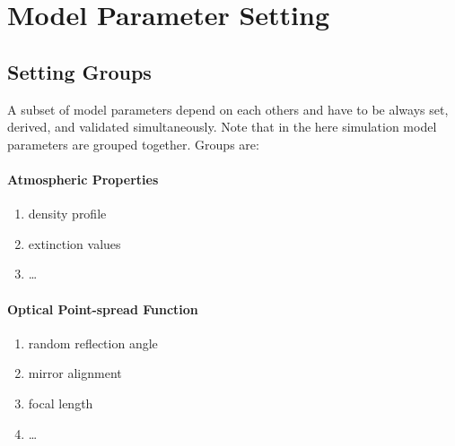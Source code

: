 \section{Model Parameter Setting}

\subsection{Setting Groups}

A subset of model parameters depend on each others and have to be always set, derived, and validated simultaneously.
Note that in the here simulation model parameters are grouped together.
Groups are:

\paragraph{Atmospheric Properties} \label{settingGroup:AtmosphericProperties}
    \begin{enumerate}
        \item density profile
        \item extinction values
        \item \dots
    \end{enumerate}
    
\paragraph{Optical Point-spread Function} \label{settingGroup:opticalPSF}
    \begin{enumerate}
        \item random reflection angle
        \item mirror alignment
        \item focal length
        \item \dots
    \end{enumerate}
    
